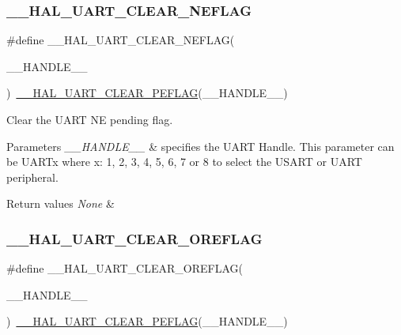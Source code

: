 \subsubsection{\texorpdfstring{\+\_\+\+\_\+\+H\+A\+L\+\_\+\+U\+A\+R\+T\+\_\+\+C\+L\+E\+A\+R\+\_\+\+N\+E\+F\+L\+AG}{\_\_HAL\_UART\_CLEAR\_NEFLAG}}
{\footnotesize\ttfamily \#define \+\_\+\+\_\+\+H\+A\+L\+\_\+\+U\+A\+R\+T\+\_\+\+C\+L\+E\+A\+R\+\_\+\+N\+E\+F\+L\+AG(\begin{DoxyParamCaption}\item[{}]{\+\_\+\+\_\+\+H\+A\+N\+D\+L\+E\+\_\+\+\_\+ }\end{DoxyParamCaption})~\mbox{\hyperlink{group___u_a_r_t___exported___macros_gaba5e19c60e0f37341b1585a380b84d49}{\+\_\+\+\_\+\+H\+A\+L\+\_\+\+U\+A\+R\+T\+\_\+\+C\+L\+E\+A\+R\+\_\+\+P\+E\+F\+L\+AG}}(\+\_\+\+\_\+\+H\+A\+N\+D\+L\+E\+\_\+\+\_\+)}



Clear the U\+A\+RT NE pending flag. 


\begin{DoxyParams}{Parameters}
{\em \+\_\+\+\_\+\+H\+A\+N\+D\+L\+E\+\_\+\+\_\+} & specifies the U\+A\+RT Handle. This parameter can be U\+A\+R\+Tx where x\+: 1, 2, 3, 4, 5, 6, 7 or 8 to select the U\+S\+A\+RT or U\+A\+RT peripheral. \\
\hline
\end{DoxyParams}

\begin{DoxyRetVals}{Return values}
{\em None} & \\
\hline
\end{DoxyRetVals}
\mbox{\label{group___u_a_r_t___exported___macros_ga9cdc2f2d55eaaa7895996bf6848df42e}} 
\subsubsection{\texorpdfstring{\+\_\+\+\_\+\+H\+A\+L\+\_\+\+U\+A\+R\+T\+\_\+\+C\+L\+E\+A\+R\+\_\+\+O\+R\+E\+F\+L\+AG}{\_\_HAL\_UART\_CLEAR\_OREFLAG}}
{\footnotesize\ttfamily \#define \+\_\+\+\_\+\+H\+A\+L\+\_\+\+U\+A\+R\+T\+\_\+\+C\+L\+E\+A\+R\+\_\+\+O\+R\+E\+F\+L\+AG(\begin{DoxyParamCaption}\item[{}]{\+\_\+\+\_\+\+H\+A\+N\+D\+L\+E\+\_\+\+\_\+ }\end{DoxyParamCaption})~\mbox{\hyperlink{group___u_a_r_t___exported___macros_gaba5e19c60e0f37341b1585a380b84d49}{\+\_\+\+\_\+\+H\+A\+L\+\_\+\+U\+A\+R\+T\+\_\+\+C\+L\+E\+A\+R\+\_\+\+P\+E\+F\+L\+AG}}(\+\_\+\+\_\+\+H\+A\+N\+D\+L\+E\+\_\+\+\_\+)}



